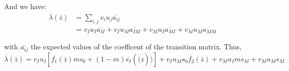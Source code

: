 And we have:
\begin{align}
	\overline{\lambda}(\overline{z}) &= \sum_{i,j}{v_{i} u_{j} \overline{a_{ij}}} \nonumber \\
	&= v_{I} u_{I} \overline{a_{II}} + v_{I} u_{M} \overline{a_{IM}} + v_{M} u_{I} \overline{a_{MI}} + v_{M} u_{M} \overline{a_{MM}}
\end{align}

with $\overline{a_{ij}}$ the expected values of the coefficent of the transition matrix. Thus,
\begin{equation}
	\overline{\lambda}(\overline{z}) = v_{I} u_{I} \left[ \overline{f_{1}}(\overline{z})m s_{0} + (1-m)\overline{s_{I}}(\overline(z)) \right] + v_{I} u_{M} s_0 \overline{f_{2}}(\overline{z})+ v_{M} u_{I} m s_M + v_{M} u_{M} s_M
\end{equation}